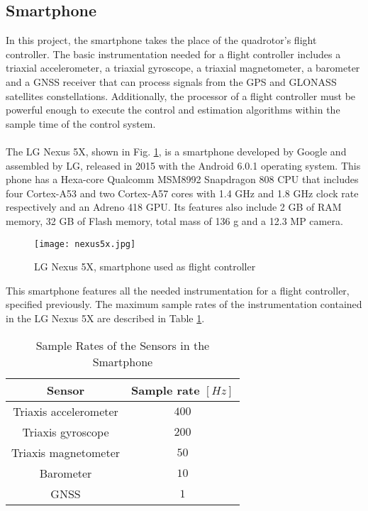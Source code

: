 \subsection{Smartphone}
In this project, the smartphone takes the place of the quadrotor's flight controller. The basic instrumentation needed for a flight controller includes a triaxial accelerometer, a triaxial gyroscope, a triaxial magnetometer, a barometer and a GNSS receiver that can process signals from the GPS and GLONASS satellites constellations. Additionally, the processor of a flight controller must be powerful enough to execute the control and estimation algorithms within the sample time of the control system.
\\\\
The LG Nexus 5X, shown in Fig. \ref{fig:nexus}, is a smartphone developed by Google and assembled by LG, released in 2015 with the Android 6.0.1 operating system. This phone has a Hexa-core Qualcomm MSM8992 Snapdragon 808 CPU that includes four Cortex-A53 and two Cortex-A57 cores with 1.4 GHz and 1.8 GHz clock rate respectively and an Adreno 418 GPU. Its features also include 2 GB of RAM memory, 32 GB of Flash memory, total mass of 136 g and a 12.3 MP camera.
\\
\begin{figure}[H]
\begin{center}
\texttt{[image: nexus5x.jpg]}    
\caption[LG Nexus 5X, smartphone used as flight controller]{LG Nexus 5X, smartphone used as flight controller\protect\footnotemark} 
\label{fig:nexus}
\end{center}
 \end{figure}
 \vspace{-0.5cm}
This smartphone features all the needed instrumentation for a flight controller, specified previously. The maximum sample rates of the instrumentation contained in the LG Nexus 5X are described in Table \ref{tb:samplerates}.
\begin{table}[h]
\small
\begin{center}
\caption{Sample Rates of the Sensors in the Smartphone}\label{tb:samplerates}
\begin{tabular}{c|c}\hline
\rule{0pt}{3ex} Sensor & Sample rate $[Hz]$ \\\hline\hline
\rule{0pt}{3ex}Triaxis accelerometer &  $400$ \\[0.7ex]
Triaxis gyroscope &  $200$ \\[0.7ex]
Triaxis magnetometer & $50$ \\[0.7ex]
Barometer &  $10$ \\[0.7ex] 
GNSS &  $1$  \\[0.7ex]\hline
\end{tabular}
\end{center}
\end{table}
